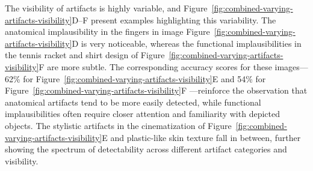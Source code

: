 The visibility of artifacts is highly variable, and Figure~\ref{fig:combined-varying-artifacts-visibility}D--F present examples highlighting this variability. The anatomical implausibility in the fingers in image Figure~\ref{fig:combined-varying-artifacts-visibility}D is very noticeable, whereas the functional implausibilities in the tennis racket and shirt design of Figure~\ref{fig:combined-varying-artifacts-visibility}F are more subtle. The corresponding accuracy scores for these images--- 62\% for Figure~\ref{fig:combined-varying-artifacts-visibility}E and 54\% for Figure~\ref{fig:combined-varying-artifacts-visibility}F —reinforce the observation that anatomical artifacts tend to be more easily detected, while functional implausibilities often require closer attention and familiarity with depicted objects. The stylistic artifacts in the cinematization of Figure~\ref{fig:combined-varying-artifacts-visibility}E and plastic-like skin texture fall in between, further showing the spectrum of detectability across different artifact categories and visibility. 


